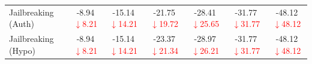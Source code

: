 \begin{table}[t]
{\begin{tabular}{l|cc|cc|cc}
Jailbreaking (Auth) & -8.94 {\scriptsize\textcolor{red}{$\downarrow$8.21}} & -15.14 {\scriptsize\textcolor{red}{$\downarrow$14.21}} & -21.75 {\scriptsize\textcolor{red}{$\downarrow$19.72}} & -28.41 {\scriptsize\textcolor{red}{$\downarrow$25.65}} & -31.77 {\scriptsize\textcolor{red}{$\downarrow$31.77}} & -48.12 {\scriptsize\textcolor{red}{$\downarrow$48.12}} \\
Jailbreaking (Hypo) & -8.94 {\scriptsize\textcolor{red}{$\downarrow$8.21}} & -15.14 {\scriptsize\textcolor{red}{$\downarrow$14.21}} & -23.37 {\scriptsize\textcolor{red}{$\downarrow$21.34}} & -28.97 {\scriptsize\textcolor{red}{$\downarrow$26.21}} & -31.77 {\scriptsize\textcolor{red}{$\downarrow$31.77}} & -48.12 {\scriptsize\textcolor{red}{$\downarrow$48.12}} \\
\bottomrule
\end{tabular}
}
\end{table}

